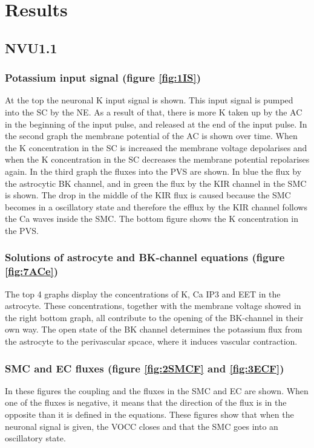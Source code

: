 %
	\section{Results}
	\subsection {NVU1.1}
	\subsubsection*{Potassium input signal (figure \ref{fig:1IS})}
	At the top the neuronal \gls{K} input signal is shown. This input signal is pumped into the SC by the \gls{NE}. As a result of that, there is more \gls{K} taken up by the \gls{AC} in the beginning of the input pulse, and released at the end of the input pulse. In the second graph the membrane potential of the AC is shown over time. When the \gls{K} concentration in the SC is increased the membrane voltage depolarises and when the \gls{K} concentration in the SC decreases the membrane potential repolarises again.
	In the third graph the fluxes into the PVS are shown. In blue the flux by the astrocytic BK channel, and in green the flux by the KIR channel in the SMC is shown. The drop in the middle of the KIR flux is caused because the SMC becomes in a oscillatory state and therefore the efflux by the KIR channel follows the \gls{Ca} waves inside the SMC.
	The bottom figure shows the \gls{K} concentration in the PVS.
	
	\subsubsection*{Solutions of astrocyte and BK-channel equations (figure \ref{fig:7ACe})}
	 The top 4 graphs display the concentrations of \gls{K}, \gls{Ca} \gls{IP3} and EET in the astrocyte. These concentrations, together with the membrane voltage showed in the right bottom graph, all contribute to the opening of the BK-channel in their own way. The open state of the BK channel determines the potassium flux from the astrocyte to the perivascular spcace, where it induces vascular contraction.
	
	\subsubsection*{SMC and EC fluxes (figure \ref{fig:2SMCF} and \ref{fig:3ECF})}
	In these figures the coupling and the fluxes in the SMC and EC are shown. When one of the fluxes is negative, it means that the direction of the flux is in the opposite than it is defined in the equations. These figures show that when the neuronal signal is given, the VOCC closes and that the SMC goes into an oscillatory state. 
	
